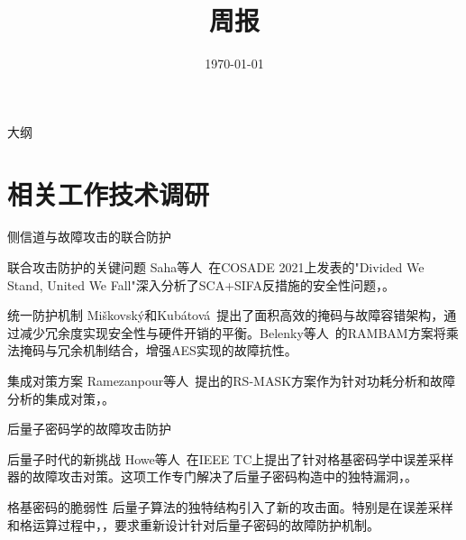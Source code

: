\documentclass{beamer}
\title{\LARGE{周报}}
\subtitle{}
\author{}
\date{\today}
\begin{document}
\begin{frame}
  \titlepage
\end{frame}

\begin{frame}{大纲}
  \tableofcontents
\end{frame}

\section{相关工作技术调研}
\begin{frame}{侧信道与故障攻击的联合防护}
  \begin{block}{联合攻击防护的关键问题}
    Saha等人~\cite{COSADE:SahBagJapMuk21}在COSADE 2021上发表的"Divided We Stand, United We Fall"深入分析了SCA+SIFA反措施的安全性问题，。
  \end{block}
  
  \begin{block}{统一防护机制}
    Miškovský和Kubátová~\cite{IEEE-TVLSI:MisKub21}提出了面积高效的掩码与故障容错架构，通过减少冗余度实现安全性与硬件开销的平衡。Belenky等人~\cite{TCHES:BelBugAzr22}的RAMBAM方案将乘法掩码与冗余机制结合，增强AES实现的故障抗性。
  \end{block}

  \begin{block}{集成对策方案}
    Ramezanpour等人~\cite{IEEE-TCAD:RamAmp20}提出的RS-MASK方案作为针对功耗分析和故障分析的集成对策，。
  \end{block}
\end{frame}

\begin{frame}{后量子密码学的故障攻击防护}
  \begin{block}{后量子时代的新挑战}
    Howe等人~\cite{IEEE-HOST:HowKhaMarNor19}在IEEE TC上提出了针对格基密码学中误差采样器的故障攻击对策。这项工作专门解决了后量子密码构造中的独特漏洞，。
  \end{block}
  
  \begin{block}{格基密码的脆弱性}
    后量子算法的独特结构引入了新的攻击面。特别是在误差采样和格运算过程中，，要求重新设计针对后量子密码的故障防护机制。
  \end{block}
\end{frame}
\end{document}
